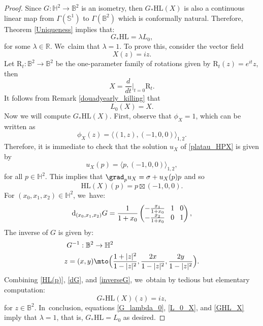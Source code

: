 \begin{proof}
Since \(G:\mathbb{H}^2 \to \mathbb{B}^2\) is an isometry, then \(G_*\mathrm{HL}(X)\) is also a continuous linear map from \(\Gamma(\mathbb{S}^1)\) to \(\Gamma(\mathbb{B}^2)\) which is conformally natural. Therefore, Theorem \ref{Uniqueness} implies that:
\begin{equation}\label{G_lambda_0}
G_*\mathrm{HL} = \lambda L_0,
\end{equation}
for some \(\lambda \in \mathbb{R}\). We~claim that \(\lambda = 1\). To prove this, consider the vector field
\[ X(z) = iz. \]
Let \(\mathrm{R}_t:\mathbb{B}^2 \to \mathbb{B}^2\) be the one-parameter family of rotations given by \(\mathrm{R}_t(z) = e^{it}z\), then
\[ X = \frac{d}{dt}\Big\lvert_{t=0}\mathrm{R}_t. \]
It follows from Remark \ref{douadyearly_killing} that
\begin{equation}\label{L_0_X}
L_0(X) = X.
\end{equation}
Now we will compute \(G_*\mathrm{HL}(X)\). First, observe that \(\phi_X = 1\), which can be written as
\[ \phi_X(z) = \langle (1,z), (-1,0,0) \rangle_{1,2}. \]
Therefore, it is immediate to check that the solution \(u_X\) of \eqref{platau_HPX} is given by
\[ u_X(p) = \langle p, (-1,0,0) \rangle_{1,2}, \]
for all \(p \in \mathbb{H}^2\). This implies that \(\grad_p u_X = \sigma + u_X(p) p\) and so
\begin{equation}\label{HL(p)}
\mathrm{HL}(X)(p) = p \boxtimes (-1,0,0).
\end{equation}
For \((x_0,x_1,x_2) \in \mathbb{H}^2\), we~have:
\begin{equation}\label{dG}
\arraycolsep4pt
\mathrm{d}_{(x_0,x_1,x_2)}G = \frac{1}{1 + x_0} \begin{pmatrix}
-\frac{x_1}{1 + x_0} & 1 & 0 \\
-\frac{x_2}{1 + x_0} & 0 & 1
\end{pmatrix},
\end{equation}
The inverse of \(G\) is given by:
\begin{equation}\label{inverseG}
\begin{aligned}
G^{-1}:\mathbb{B}^2 & \to \mathbb{H}^2 \\
z = (x,y) & \mto\Bigl(\frac{1 + \lvert z \rvert^2}{1 - \lvert z \rvert^2}, \frac{2x}{1 - \lvert z \rvert^2}, \frac{2y}{1 - \lvert z \rvert^2} \Bigr).
\end{aligned}
\end{equation}
Combining \eqref{HL(p)}, \eqref{dG}, and \eqref{inverseG}, we~obtain by tedious but elementary computation:
\begin{equation}\label{GHL_X}
G_*\mathrm{HL}(X)(z) = iz,
\end{equation}
for \(z \in \mathbb{B}^2\). In~conclusion, equations \eqref{G_lambda_0}, \eqref{L_0_X}, and \eqref{GHL_X} imply that \(\lambda = 1\), that is, \(G_*\mathrm{HL} = L_0\) as desired.
\end{proof}

